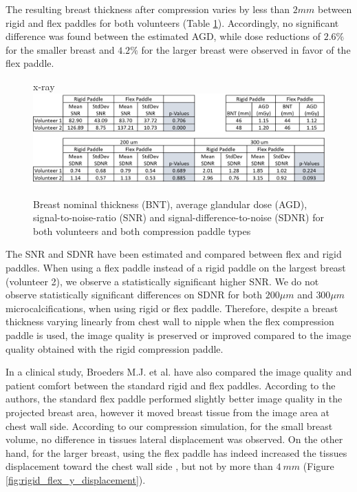 The resulting breast thickness after compression varies by less than $2mm$ between rigid and flex paddles for both volunteers (Table \ref{fig:table_compression_results}). Accordingly, no significant difference was found between the estimated AGD, while dose reductions of $2.6 \%$ for the smaller breast and $4.2\%$ for the larger breast were observed in favor of the flex paddle.

\begin{figure}[!h]x-ray
\centering
\includegraphics[width=\textwidth,keepaspectratio]{figures/table_compression_results.png} 
\caption{Breast nominal thickness (BNT), average glandular dose (AGD), signal-to-noise-ratio (SNR) and signal-difference-to-noise (SDNR) for both volunteers and both compression paddle types}\label{fig:table_compression_results}
\end{figure}

The SNR and SDNR have been estimated and compared between flex and rigid paddles. When using a flex paddle instead of a rigid paddle on the largest breast (volunteer 2), we observe a statistically significant higher SNR. We do not observe statistically significant differences on SDNR for both $200\mu m$ and $300\mu m$ microcalcifications, when using rigid or flex paddle. Therefore, despite a breast thickness varying linearly from chest wall to nipple when the flex compression paddle is used, the image quality is preserved or improved compared to the image quality obtained with the rigid compression paddle.

In a clinical study, Broeders M.J. et al. \citep{broeders_comparison_2015} have also compared the image quality and patient comfort between the standard rigid and flex paddles. According to the authors, the standard flex paddle performed slightly better image quality in the projected breast area, however it moved breast tissue from the image area at chest wall side. According to our compression simulation, for the small breast volume, no difference in tissues lateral displacement was observed. On the other hand, for the larger breast, using the flex paddle has indeed increased the tissues displacement toward the chest wall side , but not by more than $4 \ mm$ (Figure \ref{fig:rigid_flex_y_displacement}).  

